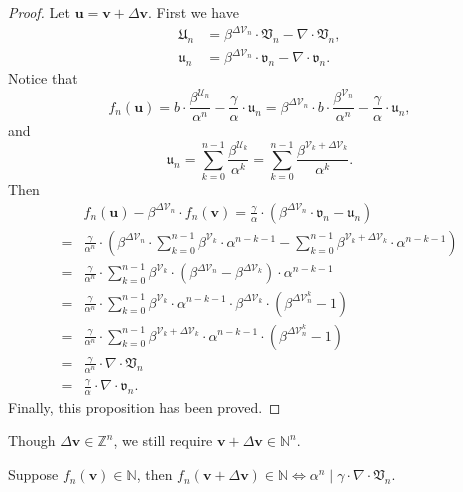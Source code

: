 \begin{proof}
    Let $\bm{u} = \bm{v} + \Delta\bm{v}$. First we have
    \begin{align*}
        \mathfrak{U}_{n} &= \beta^{\Delta\mathcal{V}_n}\cdot\mathfrak{V}_n - \nabla\cdot\mathfrak{V}_{n},\\
        \mathfrak{u}_{n} &= \beta^{\Delta\mathcal{V}_n}\cdot\mathfrak{v}_n - \nabla\cdot\mathfrak{v}_{n}.
    \end{align*}
    Notice that
    \[f_{n}(\bm{u}) = b \cdot \frac{\beta^{\mathcal{U}_{n}}}{\alpha^{n}} - \frac{\gamma}{\alpha}\cdot \mathfrak{u}_{n} = \beta^{\Delta\mathcal{V}_n} \cdot b\cdot \frac{\beta^{\mathcal{V}_{n}}}{\alpha^{n}} - \frac{\gamma}{\alpha}\cdot \mathfrak{u}_{n},\]
    and
    \[ \mathfrak{u}_{n} = \sum_{k=0}^{n-1}\frac{\beta^{\mathcal{U}_k}}{\alpha^{k}} = \sum_{k=0}^{n-1}\frac{\beta^{\mathcal{V}_k + \Delta\mathcal{V}_k}}{\alpha^{k}}. \]
    Then
    \begin{align*}
        & f_{n}(\bm{u}) - \beta^{\Delta\mathcal{V}_{n}}\cdot f_{n}(\bm{v}) = \frac{\gamma}{\alpha}\cdot\left(\beta^{\Delta\mathcal{V}_{n}}\cdot\mathfrak{v}_{n} - \mathfrak{u}_{n} \right) \\
        =&\frac{\gamma}{\alpha^{n}}\cdot\left(\beta^{\Delta\mathcal{V}_{n}}\cdot\sum_{k=0}^{n-1}\beta^{\mathcal{V}_{k}}\cdot\alpha^{n-k-1} - \sum_{k=0}^{n-1}\beta^{\mathcal{V}_{k}+\Delta\mathcal{V}_{k}}\cdot\alpha^{n-k-1} \right) \\
        =&\frac{\gamma}{\alpha^{n}}\cdot\sum_{k=0}^{n-1}\beta^{\mathcal{V}_{k}}\cdot(\beta^{\Delta\mathcal{V}_{n}} - \beta^{\Delta\mathcal{V}_{k}})\cdot\alpha^{n-k-1} \\
        =&\frac{\gamma}{\alpha^{n}}\cdot\sum_{k=0}^{n-1}\beta^{\mathcal{V}_{k}}\cdot\alpha^{n-k-1}\cdot\beta^{\Delta\mathcal{V}_{k}}\cdot(\beta^{\Delta\mathcal{V}_{n}^{k}} - 1) \\
        =&\frac{\gamma}{\alpha^{n}}\cdot\sum_{k=0}^{n-1}\beta^{\mathcal{V}_{k} + \Delta\mathcal{V}_{k}}\cdot\alpha^{n-k-1}\cdot(\beta^{\Delta\mathcal{V}_{n}^{k}} - 1)\\
        =&\frac{\gamma}{\alpha^{n}}\cdot \nabla\cdot\mathfrak{V}_{n}
        \\
        =&\frac{\gamma}{\alpha}\cdot \nabla\cdot\mathfrak{v}_{n}.
    \end{align*}
    Finally, this proposition has been proved.
\end{proof}
\begin{remark}
Though $\Delta\bm{v} \in \mathbb{Z}^{n}$, we still require $\bm{v} + \Delta\bm{v} \in\mathbb{N}^{n}$.
\end{remark}
\begin{corollary}
    Suppose $f_{n}(\bm{v})\in\mathbb{N}$, then $f_{n}(\bm{v} + \Delta\bm{v})\in\mathbb{N} \Leftrightarrow \alpha^{n} \mid \gamma\cdot\nabla\cdot\mathfrak{V}_{n}$.
\end{corollary}

